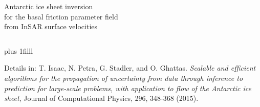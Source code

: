 \documentclass[10pt,final,xcolor=dvipsnames,aspect ratio=169]{beamer}
\newcommand{\btVFill}{\vskip0pt plus 1filll}
\begin{document}
\begin{frame}
\begin{columns}
\begin{column}{0.51\paperwidth}
			\vspace{0.1in}
			\begin{center}
				{\scriptsize Antarctic ice sheet inversion \\ for the basal friction parameter field \\
					\vspace{-0.05in}
					from InSAR surface velocities}
			\end{center}
		\end{column}
	\end{columns}
	
	\btVFill
	
	\scriptsize{Details in: T. Isaac, N. Petra, G. Stadler, and
		O. Ghattas. {\em Scalable and efficient algorithms for the
			propagation of uncertainty from data through inference to
			prediction for large-scale problems, with application to flow of
			the Antarctic ice sheet}, Journal of Computational Physics, 296,
		348-368 (2015).}
\end{frame}
\end{document}
